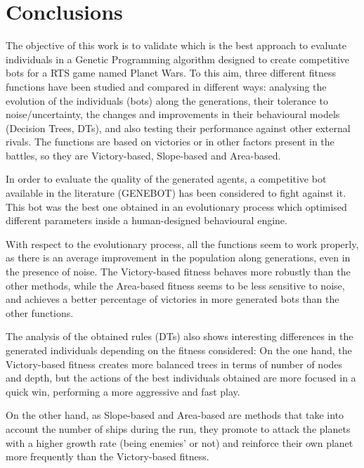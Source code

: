 \documentclass[preprint]{elsarticle}
\begin{document}
\section{Conclusions}
\label{sec:conclusion}

The objective of this work is to validate which is the best approach to evaluate individuals in a Genetic Programming algorithm designed to create competitive bots for a RTS game named Planet Wars. To this aim, three different fitness functions have been studied and compared in different ways: analysing the evolution of the individuals (bots) along the generations, their tolerance to noise/uncertainty, the changes and improvements in their behavioural models (Decision Trees, DTs), and also testing their performance against other external rivals. The functions are based on victories or in other factors present in the battles, so they are Victory-based, Slope-based and Area-based. 
 
In order to evaluate the quality of the generated agents, a competitive bot
available in the literature (GENEBOT) has been considered to fight against it. This bot was the best one obtained in an evolutionary process which optimised different parameters inside a human-designed behavioural engine.  

With respect to the evolutionary process, all the functions seem to work properly, as there is an average improvement in the population along generations, even in the presence of noise. The Victory-based fitness behaves more robustly than the other methods, while the Area-based fitness seems to be less sensitive to noise, and achieves a better percentage of victories in more generated bots than the other functions.

The analysis of the obtained rules (DTs) also shows interesting differences in the generated individuals depending on the fitness considered: 
On the one hand, the Victory-based fitness creates more balanced trees in terms of number of nodes and depth, but the actions of the best individuals obtained are more focused in a quick win, performing a more aggressive and fast play. 

On the other hand, as Slope-based and Area-based are methods that take into account the number of ships during the run, they promote to attack the planets with a higher growth rate (being enemies' or not) and reinforce their own planet more frequently than the Victory-based fitness. 
\end{document}
